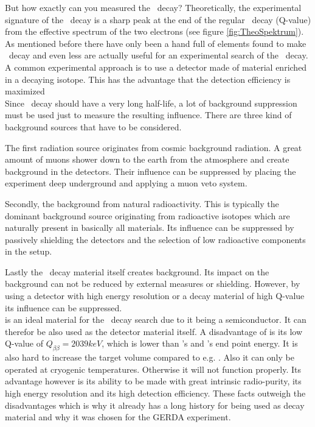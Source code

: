 \documentclass[encoding=utf8,british]{tumphthesis}
\begin{document}
But how exactly can you measured the \onbb\ decay?
Theoretically, the experimental signature of the \onbb\ decay is a sharp peak at the end of the regular \twonu\ decay (Q-value) from the effective spectrum of the two electrons (see figure \ref{fig:TheoSpektrum}).
As mentioned before there have only been a hand full of elements found to make \twonu\ decay and even less are actually useful for an experimental search of the \onbb\ decay.
A common experimental approach is to use a detector made of material enriched in a \onbb\-decaying isotope.
This has the advantage that the detection efficiency is maximized
\\

Since \onbb\ decay should have a very long half-life, a lot of background suppression must be used just to measure the resulting influence.
There are three kind of background sources that have to be considered.


The first radiation source originates from cosmic background radiation.
A great amount of muons shower down to the earth from the atmosphere and create background in the detectors.
Their influence can be suppressed by placing the experiment deep underground and applying a muon veto system.


Secondly, the background from natural radioactivity.
This is typically the dominant background source originating from radioactive isotopes which are naturally present in basically all materials.
Its influence can be suppressed by passively shielding the detectors and the selection of low radioactive components in the setup. 


Lastly the \twonu\ decay material itself creates background.
Its impact on the background can not be reduced by external measures or shielding.
However, by using a detector with high energy resolution or a decay material of high Q-value its influence can be suppressed.
\\

 is an ideal material for the \onbb\ decay search due to it being a semiconductor.
It can therefor be also used as the detector material itself.
A disadvantage of  is its low Q-value of $Q_{\beta\beta} = 2039\unit{keV}$, which is lower than 's and 's end point energy.
It is also hard to increase the target volume compared to e.g. .
Also it can only be operated at cryogenic temperatures.
Otherwise it will not function properly.
Its advantage however is its ability to be made with great intrinsic radio-purity, its high energy resolution and its high detection efficiency.
These facts outweigh the disadvantages which is why it already has a long history for being used as decay material and why it was chosen for the GERDA experiment.
\\
\end{document}
